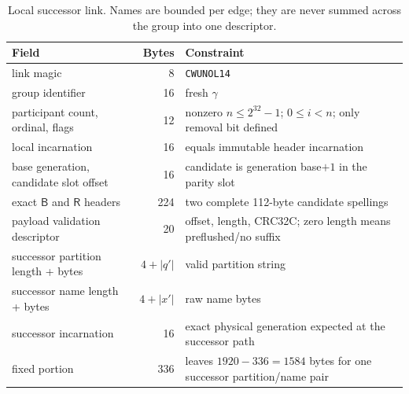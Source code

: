 \documentclass[10pt,twocolumn]{article}
\theoremstyle{remark}
\newcommand{\code}[1]{\texttt{#1}}
\newcommand{\Root}{\mathsf{R}}
\newcommand{\Prepared}{\mathsf{B}}
\newcommand{\gid}{\gamma}
\begin{document}
\begin{table}[t]
\centering
\small
\begin{tabularx}{\textwidth}{@{}l r X@{}}
\toprule
Field & Bytes & Constraint \\
\midrule
link magic & 8 & \code{CWUNOL14} \\
group identifier & 16 & fresh $\gid$ \\
participant count, ordinal, flags & 12 & nonzero $n\le 2^{32}-1$; $0\le i<n$; only removal bit defined \\
local incarnation & 16 & equals immutable header incarnation \\
base generation, candidate slot offset & 16 & candidate is generation base$+1$ in the parity slot \\
exact $\Prepared$ and $\Root$ headers & 224 & two complete 112-byte candidate spellings \\
payload validation descriptor & 20 & offset, length, CRC32C; zero length means preflushed/no suffix \\
successor partition length + bytes & $4+|q'|$ & valid partition string \\
successor name length + bytes & $4+|x'|$ & raw name bytes \\
successor incarnation & 16 & exact physical generation expected at the successor path \\
\midrule
fixed portion & 336 & leaves $1920-336=1584$ bytes for one successor partition/name pair \\
\bottomrule
\end{tabularx}
\caption{Local successor link. Names are bounded per edge; they are never summed across the
group into one descriptor.}
\label{tab:link}
\end{table}
\end{document}
